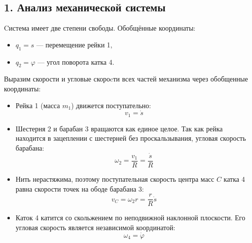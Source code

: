 \documentclass{article}
\begin{document}
\subsection*{1. Анализ механической системы}
Cистема имеет две степени свободы. Обобщённые координаты:
\begin{itemize}
\item $q_1 = s$ --- перемещение рейки 1,
\item $q_2 = \varphi$ --- угол поворота катка 4.
\end{itemize}
\par
\vspace*{0.6cm}
Выразим скорости и угловые скороcти всех частей механизма через обобщенные координаты:
\begin{itemize}
	\item Рейка 1 (масса $m_1$) движется поступательно: 
	\begin{equation*}
		v_1 = \dot{s}
	\end{equation*}
	\item Шестерня 2 и барабан 3 вращаются как единое целое. Так как рейка находится в зацеплении с шестерней без проскальзывания, угловая скорость барабана:
	\begin{equation*}
	\omega_2 = \frac{v_1}{R} = \frac{\dot{s}}{R}
	\end{equation*}
	\newpage
	\item Нить нерастяжима, поэтому поступательная скорость центра масс $C$ катка 4 равна скорости точек на ободе барабана 3:
	\begin{equation*}
	v_C = \omega_2 r = \frac{r}{R} \dot{s}
	\end{equation*}
	\item Каток 4 катится со скольжением по неподвижной наклонной плоскости. Его угловая скорость является независимой координатой:
	\begin{equation*}
	\omega_4 = \dot{\varphi}
	\end{equation*}
\end{itemize}
\end{document}
